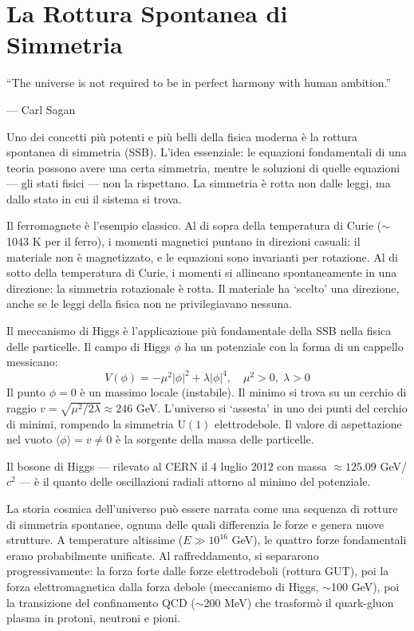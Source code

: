 \documentclass[12pt,a4paper,openany]{book}
\newcommand{\sezione}[1]{\vspace{1.2em}{\large\bfseries #1}\vspace{0.5em}\par}
\begin{document}
\chapter{La Rottura Spontanea di Simmetria}

\epigraph{``The universe is not required to be in perfect harmony with human ambition.''}{--- Carl Sagan}

\sezione{Il meccanismo più universale della fisica}

Uno dei concetti più potenti e più belli della fisica moderna è la rottura spontanea di simmetria (SSB). L'idea essenziale: le equazioni fondamentali di una teoria possono avere una certa simmetria, mentre le soluzioni di quelle equazioni — gli stati fisici — non la rispettano. La simmetria è rotta non dalle leggi, ma dallo stato in cui il sistema si trova.

Il ferromagnete è l'esempio classico. Al di sopra della temperatura di Curie ($\sim$1043 K per il ferro), i momenti magnetici puntano in direzioni casuali: il materiale non è magnetizzato, e le equazioni sono invarianti per rotazione. Al di sotto della temperatura di Curie, i momenti si allineano spontaneamente in una direzione: la simmetria rotazionale è rotta. Il materiale ha `scelto' una direzione, anche se le leggi della fisica non ne privilegiavano nessuna.

\sezione{Il campo di Higgs e il potenziale messicano}

Il meccanismo di Higgs è l'applicazione più fondamentale della SSB nella fisica delle particelle. Il campo di Higgs $\phi$ ha un potenziale con la forma di un cappello messicano:
\[
V(\phi) = -\mu^2|\phi|^2 + \lambda|\phi|^4,\quad \mu^2 > 0,\;\lambda > 0
\]
Il punto $\phi = 0$ è un massimo locale (instabile). Il minimo si trova su un cerchio di raggio $v = \sqrt{\mu^2/2\lambda} \approx 246$ GeV. L'universo si `assesta' in uno dei punti del cerchio di minimi, rompendo la simmetria $\mathrm{U}(1)$ elettrodebole. Il valore di aspettazione nel vuoto $\langle\phi\rangle = v \neq 0$ è la sorgente della massa delle particelle.

Il bosone di Higgs — rilevato al CERN il 4 luglio 2012 con massa $\approx 125.09$ GeV/$c^2$ — è il quanto delle oscillazioni radiali attorno al minimo del potenziale.

\sezione{La storia dell'universo come sequenza di rotture di simmetria}

La storia cosmica dell'universo può essere narrata come una sequenza di rotture di simmetria spontanee, ognuna delle quali differenzia le forze e genera nuove strutture. A temperature altissime ($E \gg 10^{16}$ GeV), le quattro forze fondamentali erano probabilmente unificate. Al raffreddamento, si separarono progressivamente: la forza forte dalle forze elettrodeboli (rottura GUT), poi la forza elettromagnetica dalla forza debole (meccanismo di Higgs, $\sim$100 GeV), poi la transizione del confinamento QCD ($\sim$200 MeV) che trasformò il quark-gluon plasma in protoni, neutroni e pioni.
\end{document}
